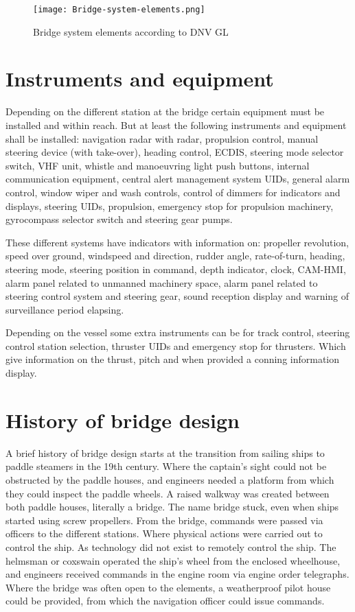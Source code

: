 \begin{figure}[H]
	\centering
	\texttt{[image: Bridge-system-elements.png]}
	\caption{Bridge system elements according to DNV GL}
	\label{fig:Bridge-system-elements}
\end{figure}

\section{Instruments and equipment}
Depending on the different station at the bridge certain equipment must be installed and within reach. But at least the following instruments and equipment shall be installed: navigation radar with radar, propulsion control, manual steering device (with take-over), heading control, \ac{ECDIS}, steering mode selector switch, \ac{VHF} unit, whistle and manoeuvring light push buttons, internal communication equipment, central alert management system \ac{UID}s, general alarm control, window wiper and wash controls, control of dimmers for indicators and displays, steering \ac{UID}s, propulsion, emergency stop for propulsion machinery, gyrocompass selector switch and steering gear pumps.

These different systems have indicators with information on: propeller revolution, speed over ground, windspeed and direction, rudder angle, rate-of-turn, heading, steering mode, steering position in command, depth indicator, clock, \ac{CAM-HMI}, alarm panel related to unmanned machinery space, alarm panel related to steering control system and steering gear, sound reception display and warning of surveillance period elapsing. 

Depending on the vessel some extra instruments can be for track control, steering control station selection, thruster \ac{UID}s and emergency stop for thrusters. Which give information on the thrust, pitch and when provided a conning information display. \cite{DNVGL2017}



\section{History of bridge design}
A brief history of bridge design starts at the transition from sailing ships to paddle steamers in the 19th century. Where the captain's sight could not be obstructed by the paddle houses, and engineers needed a platform from which they could inspect the paddle wheels. A raised walkway was created between both paddle houses, literally a bridge. The name bridge stuck, even when ships started using screw propellers. From the bridge, commands were passed via officers to the different stations. Where physical actions were carried out to control the ship. As technology did not exist to remotely control the ship. The helmsman or coxswain operated the ship's wheel from the enclosed wheelhouse, and engineers received commands in the engine room via engine order telegraphs. Where the bridge was often open to the elements, a weatherproof pilot house could be provided, from which the navigation officer could issue commands.

